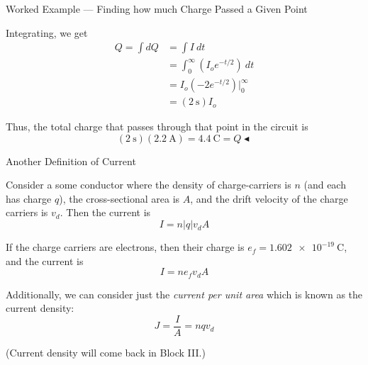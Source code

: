 \documentclass{beamer}
\begin{document}
\begin{frame}{Worked Example --- Finding how much Charge Passed a Given Point}

Integrating, we get
\begin{align*}
    Q = \int dQ &= \int I\ dt \\
                &= \int_{0}^{\infty} \left( I_o e^{-t/2} \right)\ dt \\
                &= I_o \left( -2 e^{-t/2} \right) \bigg|_{0}^{\infty} \\
                &= \left( \SI{2}{\second} \right) I_o
\end{align*}

Thus, the total charge that passes through that point in the circuit is
\begin{equation*}
    \left( \SI{2}{\second} \right) \left( \SI{2.2}{\ampere} \right) = \boxed{ \SI{4.4}{\coulomb} = Q } \blacktriangleleft
\end{equation*}

\end{frame}

\begin{frame}{Another Definition of Current}

Consider a some conductor where the density of charge-carriers is $n$ (and each has charge $q$), the cross-sectional area is $A$, and the drift velocity of the charge carriers is $v_d$. Then the current is
\begin{equation*}
    I = n \left|q\right| v_d A
\end{equation*}

If the charge carriers are electrons, then their charge is $e_f = \SI{1.602e-19}{\coulomb}$, and the current is
\begin{equation*}
    I = n e_f v_d A
\end{equation*}

Additionally, we can consider just the \emph{current per unit area} which is known as the current density:
\begin{equation*}
    J = \frac{I}{A} = n q v_d
\end{equation*}

\begin{center}
(Current density will come back in Block III.)
\end{center}

\end{frame}
\end{document}
